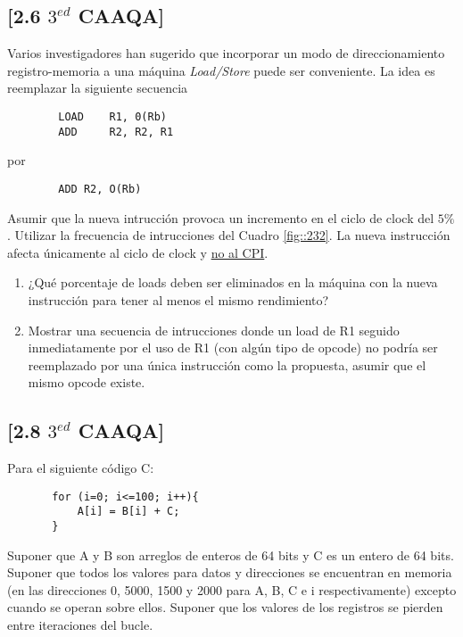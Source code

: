 \subsection{[2.6 $3^{ed}$ CAAQA]}
Varios investigadores han sugerido que incorporar un modo de direccionamiento registro-memoria a una máquina \textit{Load/Store} puede ser conveniente. La idea es reemplazar la siguiente secuencia

\begin{verbatim}
        LOAD    R1, 0(Rb)
        ADD     R2, R2, R1
\end{verbatim}

por

\begin{verbatim}
        ADD R2, O(Rb) 
\end{verbatim}



Asumir que la nueva intrucción provoca un incremento en el ciclo de clock del $5\%$. Utilizar la frecuencia de intrucciones del Cuadro \ref{fig::232}. La nueva instrucción afecta únicamente al ciclo de clock y \underline{no al CPI}.

\begin{enumerate}
\item ¿Qué porcentaje de loads deben ser eliminados en la máquina con la nueva instrucción para tener al menos el mismo rendimiento?
\item Mostrar una secuencia de intrucciones donde un load de R1 seguido inmediatamente por el uso de R1 (con algún tipo de opcode) no podría ser reemplazado por una única instrucción como la propuesta, asumir que el mismo opcode existe.  
\end{enumerate}

\subsection{[2.8 $3^{ed}$ CAAQA]}

Para el siguiente código C:
\begin{verbatim}
       for (i=0; i<=100; i++){
           A[i] = B[i] + C;
       }
\end{verbatim}


Suponer que A y B son arreglos de enteros de 64 bits y C es un entero de 64 bits. Suponer que todos los valores para datos y direcciones se encuentran en memoria (en las direcciones 0, 5000, 1500 y 2000 para A, B, C e i respectivamente) excepto cuando se operan sobre ellos. Suponer que los valores de los registros se pierden entre iteraciones del bucle.

